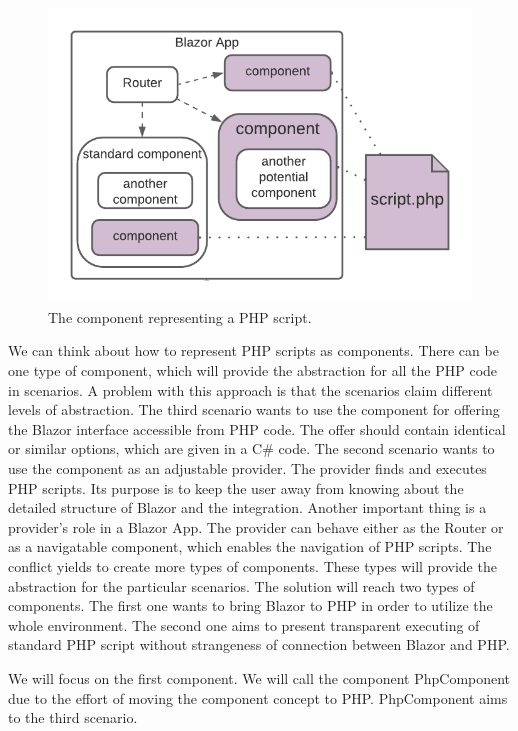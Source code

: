 \begin{figure}[H]\centering
\includegraphics{./img/component}
\caption{The component representing a PHP script.}
\label{img02:component}
\end{figure} 
\par
We can think about how to represent PHP scripts as components.
There can be one type of component, which will provide the abstraction for all the PHP code in scenarios.
A problem with this approach is that the scenarios claim different levels of abstraction.
The third scenario wants to use the component for offering the Blazor interface accessible from PHP code.
The offer should contain identical or similar options, which are given in a C\# code.
The second scenario wants to use the component as an adjustable provider.
The provider finds and executes PHP scripts.
Its purpose is to keep the user away from knowing about the detailed structure of Blazor and the integration.
Another important thing is a provider's role in a Blazor App.
The provider can behave either as the Router or as a navigatable component, which enables the navigation of PHP scripts.
The conflict yields to create more types of components.
These types will provide the abstraction for the particular scenarios.
The solution will reach two types of components.
The first one wants to bring Blazor to PHP in order to utilize the whole environment.
The second one aims to present transparent executing of standard PHP script without strangeness of connection between Blazor and PHP.
\par
We will focus on the first component.
We will call the component PhpComponent due to the effort of moving the component concept to PHP.
PhpComponent aims to the third scenario.
